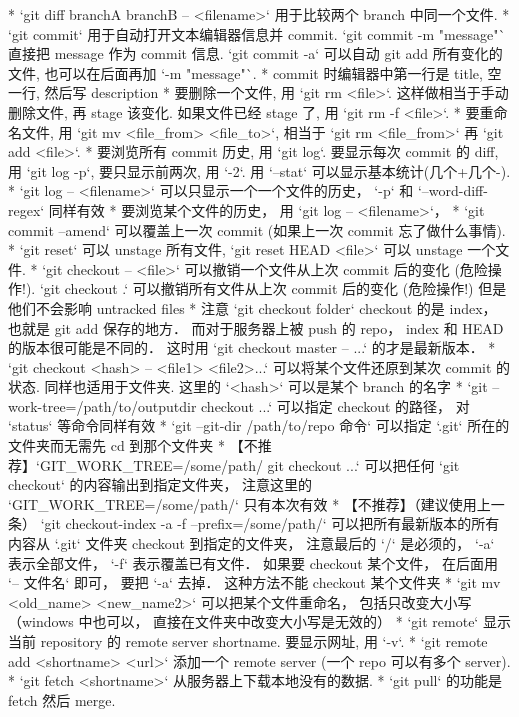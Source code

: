 * `git diff branchA branchB -- <filename>` 用于比较两个 branch 中同一个文件.
* `git commit` 用于自动打开文本编辑器信息并 commit. `git commit -m "message"` 直接把 message 作为 commit 信息. `git commit -a` 可以自动 git add 所有变化的文件, 也可以在后面再加 `-m "message"`.
* commit 时编辑器中第一行是 title, 空一行, 然后写 description
* 要删除一个文件, 用 `git rm <file>`. 这样做相当于手动删除文件, 再 stage 该变化. 如果文件已经 stage 了, 用 `git rm -f <file>`.
* 要重命名文件, 用 `git mv <file_from> <file_to>`, 相当于 `git rm <file_from>` 再 `git add <file>`.
* 要浏览所有 commit 历史, 用 `git log`. 要显示每次 commit 的 diff, 用 `git log -p`, 要只显示前两次, 用 `-2`. 用 `--stat` 可以显示基本统计(几个+几个-).
* `git log -- <filename>` 可以只显示一个一个文件的历史， `-p` 和 `--word-diff-regex` 同样有效
* 要浏览某个文件的历史， 用 `git log -- <filename>`， 
* `git commit --amend` 可以覆盖上一次 commit (如果上一次 commit 忘了做什么事情).
* `git reset` 可以 unstage 所有文件, `git reset HEAD <file>` 可以 unstage 一个文件.
* `git checkout -- <file>` 可以撤销一个文件从上次 commit 后的变化 (危险操作!). `git checkout .` 可以撤销所有文件从上次 commit 后的变化 (危险操作!) 但是他们不会影响 untracked files
* 注意 `git checkout folder` checkout 的是 index， 也就是 git add 保存的地方． 而对于服务器上被 push 的 repo， index 和 HEAD 的版本很可能是不同的． 这时用 `git checkout master -- ...` 的才是最新版本．
* `git checkout <hash> -- <file1> <file2>...` 可以将某个文件还原到某次 commit 的状态. 同样也适用于文件夹. 这里的 `<hash>` 可以是某个 branch 的名字
* `git --work-tree=/path/to/outputdir checkout ...` 可以指定 checkout 的路径， 对 `status` 等命令同样有效
* `git --git-dir /path/to/repo 命令` 可以指定 `.git` 所在的文件夹而无需先 cd 到那个文件夹
* 【不推荐】`GIT_WORK_TREE=/some/path/ git checkout ...` 可以把任何 `git checkout` 的内容输出到指定文件夹， 注意这里的 `GIT_WORK_TREE=/some/path/` 只有本次有效
* 【不推荐】（建议使用上一条） `git checkout-index -a -f --prefix=/some/path/` 可以把所有最新版本的所有内容从 `.git` 文件夹 checkout 到指定的文件夹， 注意最后的 `/` 是必须的， `-a` 表示全部文件， `-f` 表示覆盖已有文件． 如果要 checkout 某个文件， 在后面用 `-- 文件名` 即可， 要把 `-a` 去掉． 这种方法不能 checkout 某个文件夹
* `git mv <old_name> <new_name2>` 可以把某个文件重命名， 包括只改变大小写（windows 中也可以， 直接在文件夹中改变大小写是无效的）
* `git remote` 显示当前 repository 的 remote server shortname. 要显示网址, 用 `-v`.
* `git remote add <shortname> <url>` 添加一个 remote server (一个 repo 可以有多个 server).
* `git fetch <shortname>` 从服务器上下载本地没有的数据.
* `git pull` 的功能是 fetch 然后 merge.
